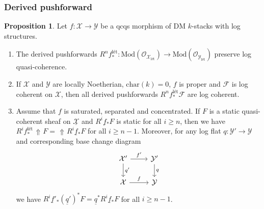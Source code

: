 \documentclass[11pt]{amsart}
\newcommand{\MScomment}[1]{\textcolor{OliveGreen}{[MS: #1]}}
\theoremstyle{definition}
\theoremstyle{definition}
\newtheorem{proposition}[theorem]{Proposition}
\newtheorem{remark}[theorem]{Remark}
\newtheorem{definition}[theorem]{Definition}
\DeclareMathOperator{\arrowup}{\!\Uparrow \!}
\begin{document}
\subsubsection{Derived pushforward}
\begin{proposition}\label{prop: derived push log}
    Let $f\colon \mathcal{X}\rightarrow\mathcal{Y}$ be a qcqs morphism of DM $k$-stacks with log structures.
    \begin{enumerate}
        \item\label{item: derived push is qcoh} The derived pushforwards $R^nf^\text{l\'et}_*\colon \text{Mod}(\mathcal{O}_{\mathcal{X}_{\text{l\'et}}})\rightarrow \text{Mod}(\mathcal{O}_{\mathcal{Y}_{\text{l\'et}}})$ preserve log quasi-coherence.
        \item\label{item: log coherence push forward} If $\mathcal{X}$ and $\mathcal{Y}$ are locally Noetherian, $\text{char}(k)=0$, $f$ is proper and $\mathcal{F}$ is log coherent on $\mathcal{X}$, then all derived pushforwards $R^nf^\text{l\'et}_*\mathcal{F}$ are log coherent.
        \item\label{item: computing derived pushfoward} Assume that $f$ is saturated, separated and concentrated. If $F$ is a static quasi-coherent sheaf on $\underline{\mathcal{X}}$ and $R^{i}\underline{f}{}_*F$ is static for all $i\geq n$, then we have $R^{i}f^{\text{l\'et}}_*\arrowup F =\arrowup R^{i}\underline{f}{}_*F $ for all $i\geq n-1$. Moreover, for any log flat $q\colon\mathcal{Y}'\rightarrow\mathcal{Y}$ and corresponding base change diagram 
        \begin{equation}\label{diagram: cartesian log alteration shit for pushforward fuck}
            \begin{tikzcd}
                \mathcal{X}'\dar["q'"] \rar["f'"] &\mathcal{Y}'\dar["q"]\\
                \mathcal{X}\rar["f"]&\mathcal{Y}
            \end{tikzcd}
        \end{equation}
        we have $R^{i}\underline{f}{}'_* (\underline{q}')^*F = \underline{q}^*R^{i}\underline{f}{}_*F$ for all $i\geq n-1$.
    \end{enumerate}
\end{proposition}
\end{document}
